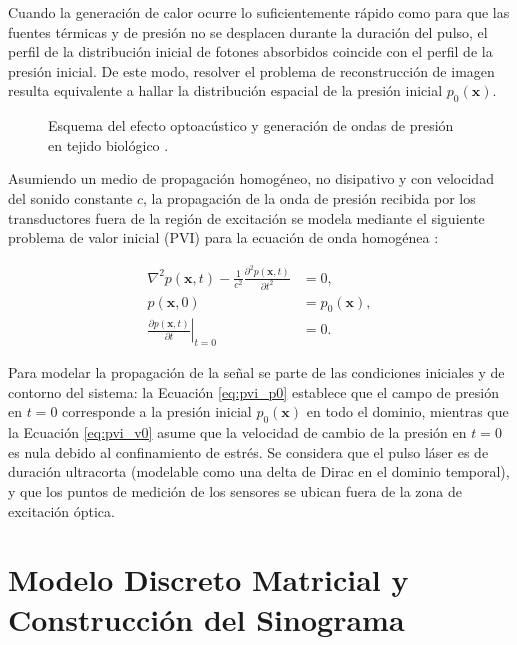 Cuando la generación de calor ocurre lo suficientemente rápido como para que las fuentes térmicas y de presión no se desplacen durante la duración del pulso, el perfil de la distribución inicial de fotones absorbidos coincide con el perfil de la presión inicial. De este modo, resolver el problema de reconstrucción de imagen resulta equivalente a hallar la distribución espacial de la presión inicial $p_0(\mathbf{x})$.

\begin{figure}[H]
    \centering
    \resizebox{0.95\textwidth}{!}{%
    }%
    \caption{Esquema del efecto optoacústico y generación de ondas de presión en tejido biológico \cite{DiLiscia2026}.}
    \label{fig:TOA_EO}
\end{figure}

Asumiendo un medio de propagación homogéneo, no disipativo y con velocidad del sonido constante $c$, la propagación de la onda de presión recibida por los transductores fuera de la región de excitación se modela mediante el siguiente problema de valor inicial (PVI) para la ecuación de onda homogénea \cite{DiLiscia2026}:

\begin{align}
    \nabla^2 p(\mathbf{x}, t) - \frac{1}{c^2} \frac{\partial^2 p(\mathbf{x}, t)}{\partial t^2} &= 0, \label{eq:onda_homogenea}
    \\
    p(\mathbf{x}, 0) &= p_0(\mathbf{x}), \label{eq:pvi_p0}
    \\
    \left. \frac{\partial p(\mathbf{x}, t)}{\partial t} \right|_{t=0} &= 0.
    \label{eq:pvi_v0}
\end{align}

Para modelar la propagación de la señal se parte de las condiciones iniciales y de contorno del sistema: la Ecuación \ref{eq:pvi_p0} establece que el campo de presión en $t=0$ corresponde a la presión inicial $p_0(\mathbf{x})$ en todo el dominio, mientras que la Ecuación \ref{eq:pvi_v0} asume que la velocidad de cambio de la presión en $t=0$ es nula debido al confinamiento de estrés.
Se considera que el pulso láser es de duración ultracorta (modelable como una delta de Dirac en el dominio temporal), y que los puntos de medición de los sensores se ubican fuera de la zona de excitación óptica.


\section{Modelo Discreto Matricial y Construcción del Sinograma}

